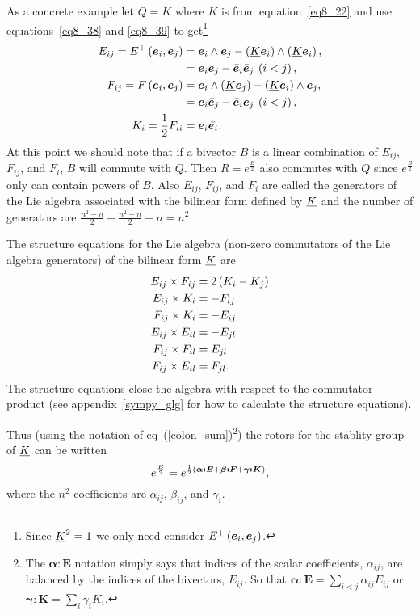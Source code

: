 As a concrete example let $Q=K$ where $K$ is from equation~\ref{eq8_22} and use equations~\ref{eq8_38} and
\ref{eq8_39} to get\footnote{Since $\underline{K}^{2}=1$ we only need consider ${E^{+}}\left ( {\bm{e}_{i},\bm{e}_{j}} \right )$.}
\begin{align}
	E_{ij} = {E^{+}}\left ( {\bm{e}_{i},\bm{e}_{j}} \right ) &= \bm{e}_{i}\wedge\bm{e}_{j}
	                                     -\left ( {\underline{K}\bm{e}_{i}} \right )\wedge\left ( {\underline{K}\bm{e}_{i}} \right ), \nonumber \\
	                                   &= \bm{e}_{i}\bm{e}_{j}-\bar{\bm{e}}_{i}\bar{\bm{e}}_{j}\:\left ( {i<j} \right ), \\
    F_{ij} = {F}\left ( {\bm{e}_{i},\bm{e}_{j}} \right )    &= \bm{e}_{i}\wedge\left ( {\underline{K}\bm{e}_{j}} \right )
                                         -\left ( {\underline{K}\bm{e}_{i}} \right )\wedge\bm{e}_{j}, \nonumber \\
                                       &= \bm{e}_{i}\bar{\bm{e}}_{j}- \bar{\bm{e}}_{i}\bm{e}_{j}\:\left ( {i<j} \right ), \\
    K_{i} = \displaystyle\frac{1}{2} F_{ii} &= \bm{e}_{i}\bar{\bm{e}_{i}}.
\end{align}
At this point we should note that if a bivector $B$ is a linear combination of $E_{ij}$, $F_{ij}$, and 
$F_{i}$, $B$ will commute with $Q$. Then $R = e^{\frac{B}{2}}$ also commutes with
$Q$ since $e^{\frac{B}{2}}$ only can contain powers of $B$.  Also  $E_{ij}$, $F_{ij}$, and 
$F_{i}$ are called the generators of the Lie algebra associated with the bilinear form defined by
$\underline{K}$ and the number of generators are $\frac{n^{2}-n}{2}+ \frac{n^{2}-n}{2}+n = n^{2}$. 

The structure equations for the Lie algebra (non-zero commutators of the Lie algebra generators) of the bilinear form
$\underline{K}$ are
\begin{align}
	E_{ij}  \times F_{ij} &=  2\left ( {K_{i}-K_{j}} \right )\\
	E_{ij}  \times K_{i}  &= -F_{ij}\\
	F_{ij}  \times K_{i}  &= -E_{ij}\\
	E_{ij}  \times E_{il} &= -E_{jl}\\
	F_{ij}  \times F_{il} &= E_{jl}\\
	F_{ij}  \times E_{il} &= F_{jl}.
\end{align}
The structure equations close the algebra with respect to the commutator product (see appendix~\ref{sympy_glg} for how 
to calculate the structure equations).

Thus (using the notation of eq~(\ref{colon_sum})\footnote{The $\bm{\alpha : E}$ notation simply says 
that indices of the scalar coefficients, $\alpha_{ij}$, are balanced by the indices of the 
bivectors, $E_{ij}$.  So that $\bm{\alpha : E} = \sum_{i<j}\alpha_{ij}E_{ij}$ or 
$\bm{\gamma : K} = \sum_{i}\gamma_{i}K_{i}$.}) the rotors for the stablity group of $\underline{K}$ can be
written
\begin{equation}
	e^{\frac{B}{2}} = e^{\frac{1}{2}\left ( {\bm{\alpha : E} + \bm{\beta : F} + \bm{\gamma : K}} \right )},
\end{equation}
where the $n^{2}$ coefficients are $\alpha_{ij}$, $\beta_{ij}$, and $\gamma_{i}$.

